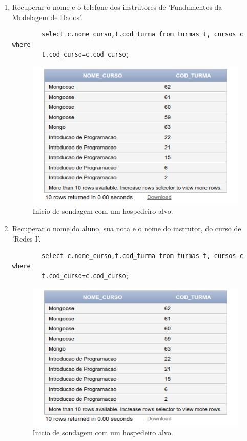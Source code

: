 \documentclass[
article,			%
11pt,				%
oneside,			%
a4paper,			%
english,			%
brazil,				%
sumario=tradicional
]{abntex2}
\begin{document}
\begin{enumerate}
	 	
	 	\item  Recuperar o nome e o telefone dos instrutores
	 	de 'Fundamentos da Modelagem de Dados'.
	 	\begin{verbatim}
	 	select c.nome_curso,t.cod_turma from turmas t, cursos c where
	 	t.cod_curso=c.cod_curso;
	 	\end{verbatim}
	 	\begin{center}
	 		\begin{figure}[H]
	 			\centering
	 			\includegraphics[scale=0.5]{./at-08.png}
	 			\caption{Inicio de sondagem com um hospedeiro alvo.}
	 			\label{rota-1}
	 		\end{figure}
	 	\end{center}
	 		\item  Recuperar o nome do aluno, sua nota e o nome
	 		do instrutor, do curso de 'Redes I'.
	 	\begin{verbatim}
	 	select c.nome_curso,t.cod_turma from turmas t, cursos c where
	 	t.cod_curso=c.cod_curso;
	 	\end{verbatim}
	 	\begin{center}
	 		\begin{figure}[H]
	 			\centering
	 			\includegraphics[scale=0.5]{./at-08.png}
	 			\caption{Inicio de sondagem com um hospedeiro alvo.}
	 			\label{rota-1}
	 		\end{figure}
	 	\end{center}
	 	
	 	
 	\end{enumerate}
	 	


	
	
\end{document}
